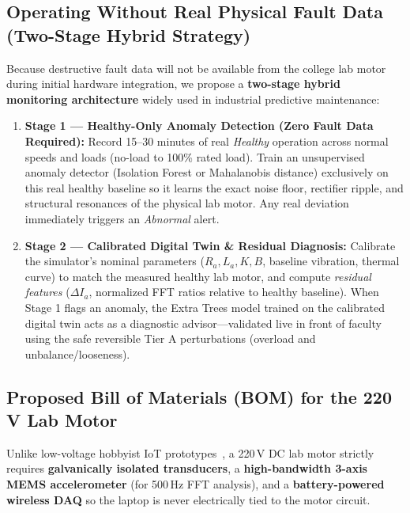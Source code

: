 \documentclass[11pt,a4paper]{article}
\begin{document}
\subsection{Operating Without Real Physical Fault Data (Two-Stage Hybrid Strategy)}

Because destructive fault data will not be available from the college lab motor during initial hardware integration, we propose a \textbf{two-stage hybrid monitoring architecture} widely used in industrial predictive maintenance:
\begin{enumerate}[leftmargin=*, itemsep=3pt]
    \item \textbf{Stage 1 — Healthy-Only Anomaly Detection (Zero Fault Data Required):} Record 15--30 minutes of real \emph{Healthy} operation across normal speeds and loads (no-load to 100\% rated load). Train an unsupervised anomaly detector (Isolation Forest or Mahalanobis distance) exclusively on this real healthy baseline so it learns the exact noise floor, rectifier ripple, and structural resonances of the physical lab motor. Any real deviation immediately triggers an \emph{Abnormal} alert.
    \item \textbf{Stage 2 — Calibrated Digital Twin \& Residual Diagnosis:} Calibrate the simulator's nominal parameters ($R_a, L_a, K, B$, baseline vibration, thermal curve) to match the measured healthy lab motor, and compute \emph{residual features} ($\Delta I_a$, normalized FFT ratios relative to healthy baseline). When Stage 1 flags an anomaly, the Extra Trees model trained on the calibrated digital twin acts as a diagnostic advisor—validated live in front of faculty using the safe reversible Tier A perturbations (overload and unbalance/looseness).
\end{enumerate}

\subsection{Proposed Bill of Materials (BOM) for the 220 V Lab Motor}

Unlike low-voltage hobbyist IoT prototypes~\cite{chougule2026}, a 220\,V DC lab motor strictly requires \textbf{galvanically isolated transducers}, a \textbf{high-bandwidth 3-axis MEMS accelerometer} (for 500\,Hz FFT analysis), and a \textbf{battery-powered wireless DAQ} so the laptop is never electrically tied to the motor circuit.
\end{document}
